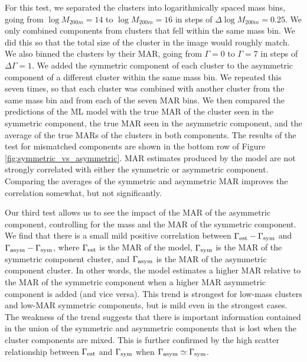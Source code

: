 \documentclass[twocolumn, linenumbers, 11pt]{aastex63}%
\begin{document}
For this test, we separated the clusters into logarithmically spaced mass bins, going from $\log M_{200m} = 14$ to $\log M_{200m} = 16$ in steps of $\Delta\log M_{200m} = 0.25$. We only combined components from clusters that fell within the same mass bin. We did this so that the total size of the cluster in the image would roughly match. We also binned the clusters by their MAR, going from $\Gamma = 0$ to $\Gamma 
 = 7$ in steps of $\Delta \Gamma = 1$. We added the symmetric component of each cluster to the asymmetric component of a different cluster within the same mass bin. We repeated this seven times, so that each cluster was combined with another cluster from the same mass bin and from each of the seven MAR bins. We then compared the predictions of the ML model with the true MAR of the cluster seen in the symmetric component, the true MAR seen in the asymmetric component, and the average of the true MARs of the clusters in both components. The results of the test for mismatched components are shown in the bottom row of Figure \ref{fig:symmetric_vs_asymmetric}. MAR estimates produced by the model are not strongly correlated with either the symmetric or asymmetric component. Comparing the averages of the symmetric and asymmetric MAR improves the correlation somewhat, but not significantly.

 Our third test allows us to see the impact of the MAR of the asymmetric component, controlling for the mass and the MAR of the symmetric component. We find that there is a small mild positive correlation between $\Gamma_{\rm est} - \Gamma_{\rm sym}$ and $\Gamma_{\rm asym} - \Gamma_{\rm sym}$, where $\Gamma_{\rm est}$ is the MAR of the model, $\Gamma_{\rm sym}$ is the MAR of the symmetric component cluster, and $\Gamma_{\rm asym}$ is the MAR of the asymmetric component cluster. In other words, the model estimates a higher MAR relative to the MAR of the symmetric component when a higher MAR asymmetric component is added (and vice versa). This trend is strongest for low-mass clusters and low-MAR symmetric components, but is mild even in the strongest cases. The weakness of the trend suggests that there is important information contained in the union of the symmetric and asymmetric components that is lost when the cluster components are mixed. This is further confirmed by the high scatter relationship between $\Gamma_{\rm est}$ and $\Gamma_{\rm sym}$ when $\Gamma_{\rm asym} \simeq \Gamma_{\rm sym}$.
\end{document}
